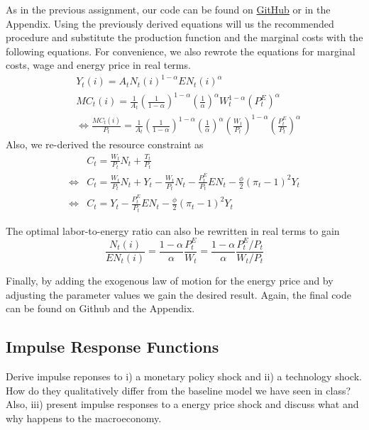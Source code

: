 \documentclass[a4paper,11pt]{article}
\begin{document}
As in the previous assignment, our code can be found on \href{https://github.com/therealLucasPaul/AdvMacroeconomics2_Assignments}{GitHub} or in the Appendix. Using the previously derived equations will us the recommended procedure and substitute the production function and the marginal costs with the following equations. For convenience, we also rewrote the equations for marginal costs, wage and energy price in real terms. 
\begin{align*}
&Y_t(i) = A_tN_t(i)^{1-\alpha}EN_t(i)^\alpha \\
&MC_t(i) = \frac{1}{A_t} \left( \frac{1}{1-\alpha}\right)^{1-\alpha} \left( \frac{1}{\alpha}\right)^\alpha W_t^{1-\alpha}(P^E_t)^{\alpha}\\
&\iff \frac{MC_t(i)}{P_t} = \frac{1}{A_t} \left( \frac{1}{1-\alpha}\right)^{1-\alpha} \left( \frac{1}{\alpha}\right)^\alpha \left(\frac{W_t}{P_t}\right)^{1-\alpha}\left(\frac{P^E_t}{P_t}\right)^{\alpha}
\end{align*}
Also, we re-derived the resource constraint as
\begin{align*}
&C_t = \frac{W_t}{P_t}N_t + \frac{T_t}{P_t} \\
\iff &C_t = \frac{W_t}{P_t}N_t + Y_t - \frac{W_t}{P_t}N_t-\frac{P^E_t}{P_t}EN_t - \frac{\phi}{2}(\pi_t-1)^2Y_t\\ 
\iff &C_t = Y_t -\frac{P^E_t}{P_t}EN_t - \frac{\phi}{2}(\pi_t-1)^2Y_t
\end{align*}

The optimal labor-to-energy ratio can also be rewritten in real terms to gain
$$\frac{N_t(i)}{EN_t(i)} = \frac{1-\alpha}{\alpha} \frac{P^E_t}{W_t} = \frac{1-\alpha}{\alpha} \frac{P^E_t/P_t}{W_t/P_t}$$

Finally, by adding the exogenous law of motion for the energy price and by adjusting the parameter values we gain the desired result. Again, the final code can be found on Github and the Appendix.\\

\pagebreak

\begin{qbox}{\subsection{Impulse Response Functions}}
Derive impulse reponses to i) a monetary policy shock and ii) a technology shock. How do they qualitatively differ from the baseline model we have seen in class? Also, iii) present impulse responses to a energy price shock and discuss what and why happens to the macroeconomy.
\end{qbox}
\end{document}
